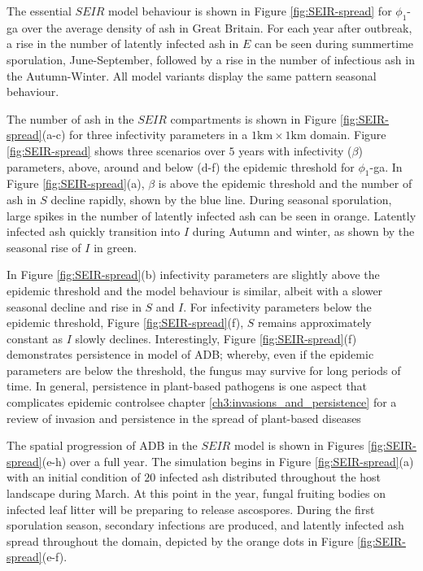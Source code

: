 The essential $SEIR$ model behaviour is shown in Figure \ref{fig:SEIR-spread} for $\phi_1$-ga over the average density of ash in Great Britain.
For each year after outbreak, a rise in the number of latently infected ash in $E$ can be seen during summertime sporulation, June-September, followed by a rise in the number of infectious ash in the Autumn-Winter. 
All model variants display the same pattern seasonal behaviour. 

The number of ash in the $SEIR$ compartments is shown in Figure \ref{fig:SEIR-spread}(a-c) for three infectivity parameters in a $1\mathrm{km}\times1\mathrm{km}$ domain.
Figure \ref{fig:SEIR-spread} shows three scenarios over $5$ years with infectivity ($\beta$) parameters, above, around and below (d-f) the epidemic threshold for $\phi_1$-ga.
In Figure \ref{fig:SEIR-spread}(a), $\beta$ is above the epidemic threshold and the number of ash in $S$ decline rapidly, shown by the blue line. 
During seasonal sporulation, large spikes in the number of latently infected ash can be seen in orange. 
Latently infected ash quickly transition into $I$ during Autumn and winter, as shown by the seasonal rise of $I$ in green.

In Figure \ref{fig:SEIR-spread}(b) infectivity parameters are slightly above the epidemic threshold and the model behaviour is similar, albeit with a slower seasonal decline and rise in $S$ and $I$.
For infectivity parameters below the epidemic threshold, Figure \ref{fig:SEIR-spread}(f), $S$ remains approximately constant as $I$ slowly declines. 
Interestingly, Figure \ref{fig:SEIR-spread}(f) demonstrates persistence in model of ADB; 
whereby, even if the epidemic parameters are below the threshold, the fungus may survive for long periods of time. 
In general, persistence in plant-based pathogens is one aspect that complicates epidemic control\textemdash see chapter \ref{ch3:invasions_and_persistence} for a review of invasion and persistence in the spread of plant-based diseases

The spatial progression of ADB in the $SEIR$ model is shown in Figures \ref{fig:SEIR-spread}(e-h) over a full year. 
The simulation begins in Figure \ref{fig:SEIR-spread}(a) with an initial condition of $20$ infected ash distributed throughout the host landscape during March. 
At this point in the year, fungal fruiting bodies on infected leaf litter will be preparing to release ascospores.
During the first sporulation season, secondary infections are produced, and latently infected ash spread throughout the domain, depicted by the orange dots in Figure \ref{fig:SEIR-spread}(e-f). 

